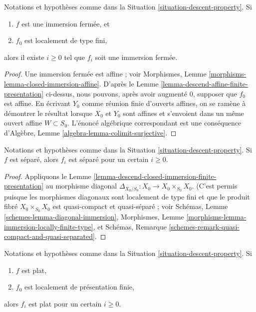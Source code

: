 \begin{lemma}
\label{lemma-descend-closed-immersion-finite-presentation}
Notations et hypothèses comme dans la
Situation \ref{situation-descent-property}. Si
\begin{enumerate}
\item $f$ est une immersion fermée, et
\item $f_0$ est localement de type fini,
\end{enumerate}
alors il existe $i \geq 0$ tel que $f_i$ soit une immersion fermée.
\end{lemma}

\begin{proof}
Une immersion fermée est affine ; voir Morphismes,
Lemme \ref{morphisms-lemma-closed-immersion-affine}. D'après le
Lemme \ref{lemma-descend-affine-finite-presentation} ci-dessus, nous pouvons,
après avoir augmenté $0$, supposer que $f_0$ est affine. En écrivant $Y_0$
comme réunion finie d'ouverts affines, on se ramène à démontrer le résultat
lorsque $X_0$ et $Y_0$ sont affines et s'envoient dans un même ouvert affine
$W \subset S_0$. L'énoncé algébrique correspondant est une conséquence
d'Algèbre, Lemme \ref{algebra-lemma-colimit-surjective}.
\end{proof}

\begin{lemma}
\label{lemma-descend-separated-finite-presentation}
Notations et hypothèses comme dans la
Situation \ref{situation-descent-property}. Si $f$ est séparé, alors $f_i$
est séparé pour un certain $i \geq 0$.
\end{lemma}

\begin{proof}
Appliquons le Lemme \ref{lemma-descend-closed-immersion-finite-presentation}
au morphisme diagonal
$\Delta_{X_0/S_0} : X_0 \to X_0 \times_{S_0} X_0$. (C'est permis puisque
les morphismes diagonaux sont localement de type fini et que le produit
fibré $X_0 \times_{S_0} X_0$ est quasi-compact et quasi-séparé ; voir
Schémas, Lemme \ref{schemes-lemma-diagonal-immersion}, Morphismes,
Lemme \ref{morphisms-lemma-immersion-locally-finite-type}, et Schémas,
Remarque \ref{schemes-remark-quasi-compact-and-quasi-separated}.
\end{proof}

\begin{lemma}
\label{lemma-descend-flat-finite-presentation}
Notations et hypothèses comme dans la
Situation \ref{situation-descent-property}. Si
\begin{enumerate}
\item $f$ est plat,
\item $f_0$ est localement de présentation finie,
\end{enumerate}
alors $f_i$ est plat pour un certain $i \geq 0$.
\end{lemma}


